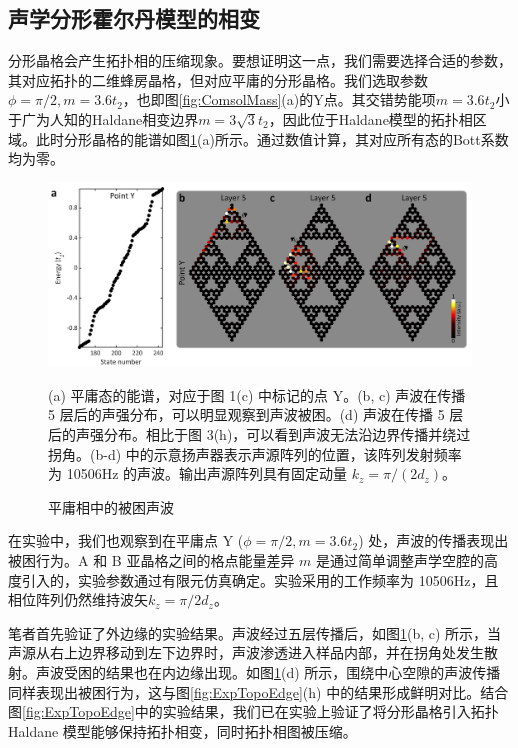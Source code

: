 \subsection{声学分形霍尔丹模型的相变}
分形晶格会产生拓扑相的压缩现象。要想证明这一点，我们需要选择合适的参数，其对应拓扑的二维蜂房晶格，但对应平庸的分形晶格。我们选取参数$\phi = \pi/2, m = 3.6t_2$，也即图\ref{fig:ComsolMass}(a)的Y点。其交错势能项$m = 3.6t_2$小于广为人知的Haldane相变边界$m = 3\sqrt{3}t_2$，因此位于Haldane模型的拓扑相区域。此时分形晶格的能谱如图\ref{fig:ExpTrivial}(a)所示。通过数值计算，其对应所有态的Bott系数均为零。

\begin{figure}[htbp]
    \centering
    \includegraphics[width=0.75\linewidth]{figure/FracHaldExp/ExpTrivial.png}
    \caption{平庸相中的被困声波}(a) 平庸态的能谱，对应于图 1(c) 中标记的点 Y。(b, c) 声波在传播 5 层后的声强分布，可以明显观察到声波被困。(d) 声波在传播 5 层后的声强分布。相比于图 3(h)，可以看到声波无法沿边界传播并绕过拐角。(b-d) 中的示意扬声器表示声源阵列的位置，该阵列发射频率为 10506Hz 的声波。输出声源阵列具有固定动量 $k_z = \pi/(2d_z)$。
    \label{fig:ExpTrivial}
\end{figure}

在实验中，我们也观察到在平庸点 Y ($\phi = \pi/2, m = 3.6t_2$) 处，声波的传播表现出被困行为。A 和 B 亚晶格之间的格点能量差异 $m$ 是通过简单调整声学空腔的高度引入的，实验参数通过有限元仿真确定。实验采用的工作频率为 10506Hz，且相位阵列仍然维持波矢$k_z=\pi/2d_z$。

笔者首先验证了外边缘的实验结果。声波经过五层传播后，如图\ref{fig:ExpTrivial}(b, c) 所示，当声源从右上边界移动到左下边界时，声波渗透进入样品内部，并在拐角处发生散射。声波受困的结果也在内边缘出现。如图\ref{fig:ExpTrivial}(d) 所示，围绕中心空隙的声波传播同样表现出被困行为，这与图\ref{fig:ExpTopoEdge}(h) 中的结果形成鲜明对比。结合图\ref{fig:ExpTopoEdge}中的实验结果，我们已在实验上验证了将分形晶格引入拓扑 Haldane 模型能够保持拓扑相变，同时拓扑相图被压缩。